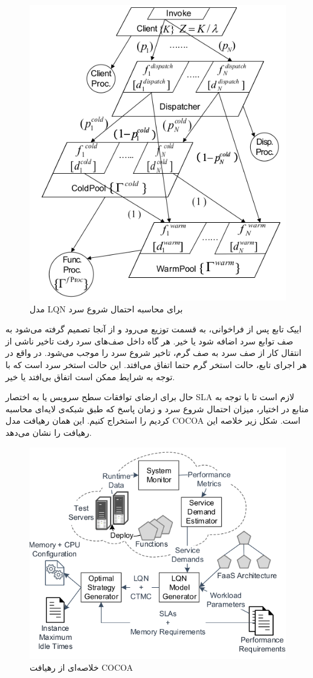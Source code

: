 \begin{figure}
	\centering
	\includegraphics[width=0.7\linewidth]{figs/COCOA-LQNModel}
	\caption {مدل LQN برای محاسبه احتمال شروع سرد}
	\label{fig:COCOA-LQNModel}
\end{figure}

اییک تابع پس از فراخوانی، به قسمت توزیع می‌رود و از آنجا تصمیم گرفته می‌شود به صف توابع سرد اضافه ‌شود یا خیر. هر گاه داخل صف‌های سرد رفت تاخیر ناشی از انتقال کار از صف سرد به صف گرم، تاخیر شروع سرد را موجب می‌شود. در واقع در هر اجرای تابع، حالت استخر گرم حتما اتفاق می‌افتد. این حالت استخر سرد است که با توجه به شرایط ممکن است اتفاق بی‌افتد یا خیر. 

حال برای ارضای توافقات سطح سرویس یا به اختصار SLA لازم است تا با توجه به منابع در اختیار، میزان احتمال شروع سرد و زمان پاسخ که طبق شبکه‌ی لایه‌ای محاسبه کردیم را استخراج کنیم. این همان رهیافت مدل COCOA است. شکل زیر خلاصه این رهیافت را نشان می‌دهد. 

\begin{figure}
	\centering
	\includegraphics[width=0.7\linewidth]{figs/COCOA-overview}
	\caption {خلاصه‌ای از رهیافت COCOA}
	\label{fig:COCOA-overview}
\end{figure}

